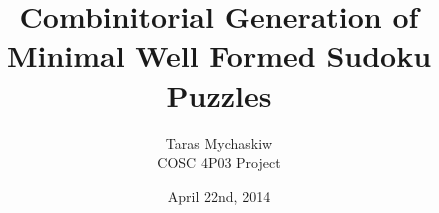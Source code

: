 \documentclass[12pt]{article}
\title{Combinitorial Generation of Minimal Well Formed Sudoku Puzzles}
\author{Taras Mychaskiw\\COSC 4P03 Project}
\date{April 22nd, 2014}
\begin{document}
\maketitle
    \begin{abstract}
    \end{abstract}

    \thispagestyle{empty}
    \tableofcontents
    \thispagestyle{empty}
    \mbox{}
    \clearpage
    \setcounter{page}{1}
    
    

    
    
\end{document}
